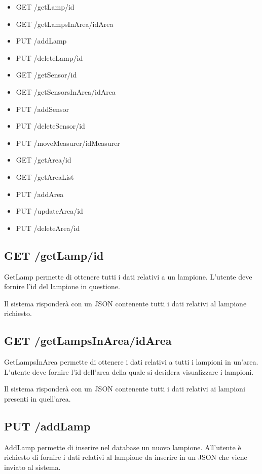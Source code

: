 \begin{itemize}
    \item GET /getLamp/id
    \item GET /getLampsInArea/idArea
    \item PUT /addLamp
    \item PUT /deleteLamp/id
    \item GET /getSensor/id
    \item GET /getSensorsInArea/idArea
    \item PUT /addSensor
    \item PUT /deleteSensor/id
    \item PUT /moveMeasurer/idMeasurer
    \item GET /getArea/id
    \item GET /getAreaList
    \item PUT /addArea
    \item PUT /updateArea/id
    \item PUT /deleteArea/id
\end{itemize}

\subsection{ GET /getLamp/id}

GetLamp permette di ottenere tutti i dati relativi a un lampione. L'utente deve fornire l'id del lampione in questione.

Il sistema risponderà con un JSON contenente tutti i dati relativi al lampione richiesto.

\subsection{ GET /getLampsInArea/idArea}

GetLampsInArea permette di ottenere i dati relativi a tutti i lampioni in un'area. L'utente deve fornire l'id dell'area della quale si desidera visualizzare i lampioni.

Il sistema risponderà con un JSON contenente tutti i dati relativi ai lampioni presenti in quell'area.

\subsection{ PUT /addLamp}

AddLamp permette di inserire nel database un nuovo lampione. All'utente è richiesto di fornire i dati relativi al lampione da inserire in un JSON che viene inviato al sistema.

